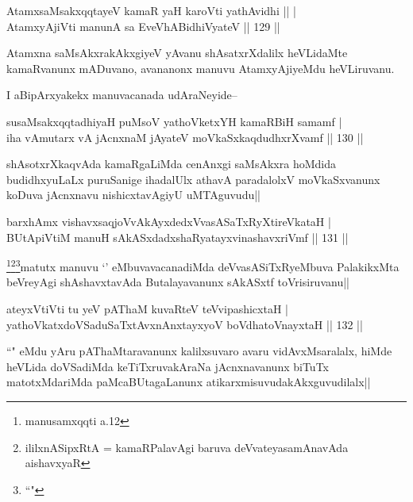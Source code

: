 \begin{shl}
AtamxsaMsakxqqtayeV kamaR yaH karoVti yathAvidhi \hfill || |\\
AtamxyAjiVti manunA sa EveVhABidhiVyateV \hfill || 129 ||
\end{shl}

\begin{artha}
Atamxna saMsAkxrakAkxgiyeV yAvanu shAsatxrXdalilx heVLidaMte kamaRvanunx mADuvano, avananonx manuvu AtamxyAjiyeMdu heVLiruvanu.
\end{artha}

\begin{artha}
I aBipArxyakekx manuvacanada udAraNeyide--
\end{artha}

\begin{shl}
susaMsakxqqtadhiyaH puMsoV yathoVketxYH kamaRBiH samamf |\\
iha vA\s mutarx vA jAcnxnaM jAyateV moVkaSxkaqdudhxrXvamf \hfill || 130 ||
\end{shl}

\begin{artha}
shAsotxrXkaqvAda kamaRgaLiMda cenAnxgi saMsAkxra hoMdida budidhxyuLaLx puruSanige ihadalUlx athavA paradalolxV moVkaSxvanunx koDuva jAcnxnavu nishicxtavAgiyU uMTAguvudu||
\end{artha}

\begin{shl}
barxhAmx vishavxsaqjoVvAkAyxdedxVvasASaTxRyXtireVkataH |\\
BUtApiVtiM manuH sAkASxdadxshaRyatayxvinashavxriVmf \hfill || 131 ||
\end{shl}

\begin{artha}
\footnote{\stext \stext manusamxqqti a.12}\footnote{\stext ililxnASipxRtA = kamaRPalavAgi baruva deVvateyasamAnavAda aishavxyaR}\footnote{``\stext"}matutx manuvu `\stext' eMbuvavacanadiMda deVvasASiTxRyeMbuva PalakikxMta beVreyAgi shAshavxtavAda Butalayavanunx sAkASxtf toVrisiruvanu||
\end{artha}

\begin{shl}
ateyxVtiVti tu yeV pAThaM kuvaRteV teV\s vipashicxtaH |\\
yathoVkatxdoVSaduSaTxtAvxnAnxtayxyoV boVdhatoV\s nayxtaH \hfill || 132 ||
\end{shl}

\begin{artha}
``\stext" eMdu yAru pAThaMtaravanunx kalilxsuvaro avaru vidAvxMsaralalx, hiMde heVLida doVSadiMda keTiTxruvakAraNa jAcnxnavanunx biTuTx matotxMdariMda paMcaBUtagaLanunx atikarxmisuvudakAkxguvudilalx||
\end{artha}

